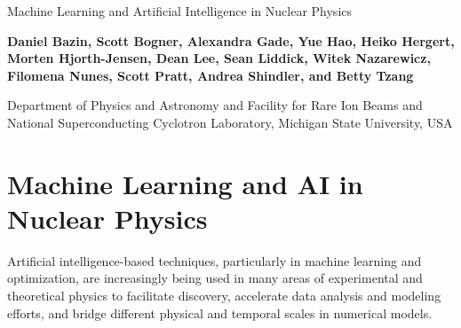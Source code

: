 \documentclass[%
oneside,                 %
final,                   %
10pt]{article}
\begin{document}

\newcommand{\exercisesection}[1]{\subsection*{#1}}






\thispagestyle{empty}

\begin{center}
{\LARGE\bf
\begin{spacing}{1.25}
Machine Learning and Artificial Intelligence in Nuclear Physics
\end{spacing}
}
\end{center}


\begin{center}
{\bf Daniel Bazin, Scott Bogner, Alexandra Gade, Yue Hao, Heiko Hergert, Morten Hjorth-Jensen, Dean Lee, Sean Liddick, Witek Nazarewicz, Filomena Nunes, Scott Pratt, Andrea Shindler, and Betty Tzang}
\end{center}

    \begin{center}
{\small Department of Physics and Astronomy and Facility for Rare Ion Beams and National Superconducting Cyclotron Laboratory, Michigan State University, USA}
\end{center}
    


\section{Machine Learning and AI in Nuclear Physics}


Artificial intelligence-based techniques, particularly in machine
learning and optimization, are increasingly being used in many areas
of experimental and theoretical physics to facilitate discovery,
accelerate data analysis and modeling efforts, and bridge different
physical and temporal scales in numerical models.
\end{document}
